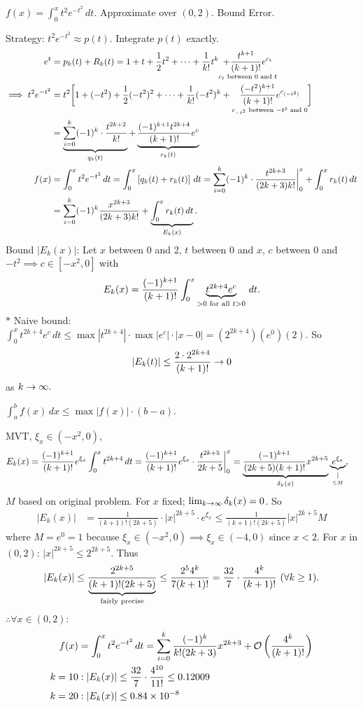 \documentclass[]{article}
\begin{document}
\begin{example}
	$f(x) = \int_0^x t^2e^{-t^2}\,dt$. Approximate over $(0,2)$. Bound Error.
	
	Strategy: $t^2e^{-t^2}\approx p(t)$. Integrate $p(t)$ exactly.
	\begin{align*}
		e^t &= p_k(t) + R_k(t) 
			= 1+t+\frac12t^2+\dots+\frac1{k!}t^k \us{c_t\text{ between 0 and }t}{+ \frac{t^{k+1}}{(k+1)!}e^{c_t}} \\
		\implies t^2e^{-t^2} &= t^2 \bigg[ 1+(-t^2) + \frac12(-t^2)^2 + \dots + \frac1{k!}(-t^2)^k + \us{c_{-t^2}\text{ between }-t^2\text{ and }0}{\frac{(-t^2)^{k+1}}{(k+1)!} e^{c_{(-t^2)}}} \bigg] \\
			&= \ub{q_k(t)}{\sum_{i=0}^k(-1)^k\cdot\frac{t^{2k+2}}{k!}} + \ub{r_k(t)}{\frac{(-1)^{k+1}t^{2k+4}}{(k+1)!}e^c} \\
		f(x) &= \int_0^x t^2e^{-t^2}\,dt 
			 = \int_0^x \blr{q_k(t) + r_k(t)}\,dt 
			 = \sum_{i=0}^k(-1)^k\cdot \frac{t^{2k+3}}{(2k+3)k!}\bigg|_0^x + \int_0^x r_k(t)\,dt \\
			 &= \sum_{i=0}^k(-1)^k\frac{x^{2k+3}}{(2k+3)k!} + \ub{E_k(x)}{\int_0^x r_k(t) \, dt}.
	\end{align*}
	Bound $|E_k(x)|$: 
	Let $x$ between 0 and 2, $t$ between 0 and $x$, $c$ between 0 and $-t^2 \implies c\in[-x^2,0]$ with
	$$E_k(x) = \frac{(-1)^{k+1}}{(k+1)!} \int_0^x \ub{>0\text{ for all }t>0}{t^{2k+4}e^c}\, dt.$$
	$*$ Naive bound: $\int_0^x t^{2k+4}e^c\,dt \leq \max |t^{2k+4}|\cdot\max|e^c|\cdot|x-0| = (2^{2k+4})(e^0)(2)$.
	So $$|E_k(t)| \leq \frac{2\cdot2^{2k+4}}{(k+1)!}\ra0$$ as $k\ra\infty.$
	\begin{recall}
		$\int_a^b f(x)\, dx \leq \max|f(x)|\cdot(b-a)$.
	\end{recall}
	MVT, $\xi_x\in(-x^2,0)$, 
	\begin{align*}
		E_k(x) &= \frac{(-1)^{k+1}}{(k+1)!}e^{\xi_x}\int_0^x t^{2k+4}\,dt 
			   = \frac{(-1)^{k+1}}{(k+1)!}e^{\xi_x}\cdot\frac{t^{2k+5}}{2k+5}\bigg|_0^x 
			   = \ub{\delta_k(x)}{\frac{(-1)^{k+1}}{(2k+5)(k+1)!}x^{2k+5}}\ub{\us{\leq M}{\mid}}{e^{\xi_x}},
	\end{align*}
	$M$ based on original problem.
	For $x$ fixed; $\lim_{k\ra\infty}\delta_k(x)=0$.
	So 
	\begin{align*}
		|E_k(x)| &= \frac1{(k+1)!(2k+5)}\cdot|x|^{2k+5}\cdot e^{\xi_x} 
				 \leq \frac1{(k+1)!(2k+5)}|x|^{2k+5}M
	\end{align*}
	where $M=e^0=1$ because $\xi_x\in(-x^2,0) \implies \xi_x\in(-4,0)$ since $x<2$.
	For $x$ in $(0,2)$: $|x|^{2k+5} \leq 2^{2k+5}$.
	Thus $$|E_k(x)|\leq \frac{2^{2k+5}}{\ub{\text{fairly precise}}{(k+1)!(2k+5)}} \leq \frac{2^54^k}{7(k+1)!} = \frac{32}{7}\cdot\frac{4^k}{(k+1)!}\ (\forall k\geq1).$$
	$\therefore \forall x\in(0,2)$:
	\begin{align*}
		f(x) &= \int_0^xt^2e^{-t^2}\,dt = \sum_{i=0}^k\frac{(-1)^k}{k!(2k+3)}x^{2k+3} + \mc O\plr{\frac{4^k}{(k+1)!}} \\
		k = 10 &: |E_k(x)| \leq \frac{32}{7}\cdot \frac{4^{10}}{11!}\leq 0.12009 \\
		k = 20 &: |E_k(x)| \leq 0.84\times 10^{-8}
	\end{align*}
\end{example}
\end{document}
